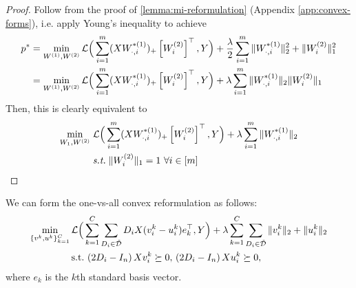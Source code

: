 \begin{proof}
    Follow from the proof of \cref{lemma:mi-reformulation} (Appendix \ref{app:convex-forms}),
    i.e. apply Young's inequality to achieve
    \begin{align*}
        p^* & =
        \min_{W^{(1)}, W^{(2)}} \mathcal{L}\Big(\sum_{i=1}^m (XW^{*(1)}_{\cdot, i})_+ \left[W^{(2)}_{i}\right]^\top, Y\Big) + \frac{\lambda}{2}\sum_{i=1}^m \|W^{*(1)}_{\cdot, i}\|_2^2 + \|W^{(2)}_{i}\|_1^2 \\
            & = \min_{W^{(1)}, W^{(2)}} \mathcal{L}\Big(\sum_{i=1}^m (XW^{*(1)}_{\cdot, i})_+ \left[W^{(2)}_{i}\right]^\top, Y\Big) + \lambda\sum_{i=1}^m \|W^{*(1)}_{\cdot, i}\|_2\|W^{(2)}_{i}\|_1
    \end{align*}
    Then, this is clearly equivalent to
    \begin{equation*}
        \begin{aligned}
            \min_{W_{1}, W^{(2)}}  \; & \mathcal{L}\Big(\sum_{i=1}^m (XW^{*(1)}_{\cdot, i})_+ \left[W^{(2)}_{i}\right]^\top, Y\Big) + \lambda \sum_{i = 1}^{m}  \|W^{*(1)}_{\cdot, i}\|_2 \\
                                      & \text{\emph{s.t.}} \;\|W^{(2)}_{i}\|_1 = 1~\forall i \in [m]
        \end{aligned}
    \end{equation*}
\end{proof}
We can form the one-vs-all convex reformulation as follows:
\begin{equation}\label{convex-forms:eq:vector-convex-relu-mlp}
    \begin{aligned}
        \min_{\{v^k, u^k\}_{k=1}^C} \, & \mathcal{L}\Big(\sum_{k=1}^C \sum_{D_i \in \tilde {\mathcal{D}}} D_i X (v_{i}^k - u_{i}^k)e_k^\top, Y\Big)+\lambda\sum_{k=1}^C\sum_{D_i \in \tilde {\mathcal{D}}}\|v_{i}^k\|_2+\|u_{i}^k\|_2 \\
                                       & \text{s.t.} \, \left(2 D_i - I_n\right) X v_{i}^k \succeq 0, \, \left(2 D_i - I_n\right) X u_{i}^k \succeq 0,
    \end{aligned}
\end{equation}
where \(e_k\) is the \(k\)th standard basis vector.

